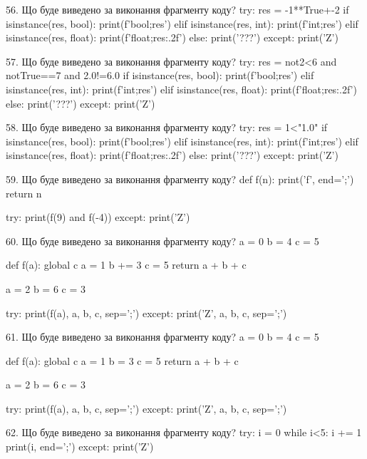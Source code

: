 \documentclass[11pt]{article}
\begin{document}

56. Що буде виведено за виконання фрагменту коду?
try:
    res = -1**True+-2
    if isinstance(res, bool):
        print(f'bool;{res}')
    elif isinstance(res, int):
        print(f'int;{res}')
    elif isinstance(res, float):
        print(f'float;{res:.2f}')
    else:
        print('???')
except:
    print('Z')


57. Що буде виведено за виконання фрагменту коду?
try:
    res = not2<6 and notTrue==7 and 2.0!=6.0
    if isinstance(res, bool):
        print(f'bool;{res}')
    elif isinstance(res, int):
        print(f'int;{res}')
    elif isinstance(res, float):
        print(f'float;{res:.2f}')
    else:
        print('???')
except:
    print('Z')


58. Що буде виведено за виконання фрагменту коду?
try:
    res = 1<"1.0"
    if isinstance(res, bool):
        print(f'bool;{res}')
    elif isinstance(res, int):
        print(f'int;{res}')
    elif isinstance(res, float):
        print(f'float;{res:.2f}')
    else:
        print('???')
except:
    print('Z')


59. Що буде виведено за виконання фрагменту коду?
def f(n):
    print('f', end=';')
    return n

try:
    print(f(9) and f(-4))
except:
    print('Z')


60. Що буде виведено за виконання фрагменту коду?
a = 0
b = 4
c = 5

def f(a):
global c    a = 1
    b += 3
    c = 5
    return a + b + c

a = 2
b = 6
c = 3

try:
    print(f(a), a, b, c, sep=';')
except:
    print('Z', a, b, c, sep=';')


61. Що буде виведено за виконання фрагменту коду?
a = 0
b = 4
c = 5

def f(a):
global c    a = 1
    b = 3
    c = 5
    return a + b + c

a = 2
b = 6
c = 3

try:
    print(f(a), a, b, c, sep=';')
except:
    print('Z', a, b, c, sep=';')


62. Що буде виведено за виконання фрагменту коду?
try:
    i = 0
    while i<5:
        i += 1
    print(i, end=';')
except:
    print('Z')
\end{document}
